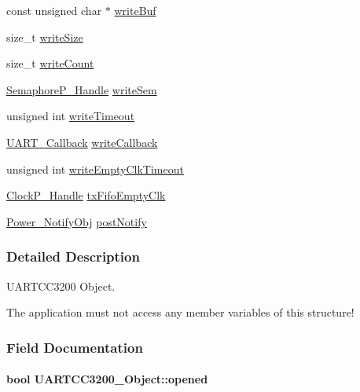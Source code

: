 \begin{DoxyCompactItemize}
\item 
const unsigned char $\ast$ \hyperlink{struct_u_a_r_t_c_c3200___object_ad0695b5fb3ae2132f990f6a803db7eed}{write\+Buf}
\item 
size\+\_\+t \hyperlink{struct_u_a_r_t_c_c3200___object_a3622ef828b2e49d747ccc609d4901cf9}{write\+Size}
\item 
size\+\_\+t \hyperlink{struct_u_a_r_t_c_c3200___object_a4c86feb4f6b6fbb006190c39befb7983}{write\+Count}
\item 
\hyperlink{_semaphore_p_8h_a7f34865f33e666455692544e5f12d1f2}{Semaphore\+P\+\_\+\+Handle} \hyperlink{struct_u_a_r_t_c_c3200___object_a21c6923ee3da9ff6fb6bd2159434997c}{write\+Sem}
\item 
unsigned int \hyperlink{struct_u_a_r_t_c_c3200___object_ad69e720af55b6156ca2fc33402531c1b}{write\+Timeout}
\item 
\hyperlink{_u_a_r_t_8h_a44620a9d91e0357ebc6f0a79984d9e1e}{U\+A\+R\+T\+\_\+\+Callback} \hyperlink{struct_u_a_r_t_c_c3200___object_a98e91ae360dc4187136f0166d5fd4dd2}{write\+Callback}
\item 
unsigned int \hyperlink{struct_u_a_r_t_c_c3200___object_abcd8361634ac3dbb99feb06a4acfd1fd}{write\+Empty\+Clk\+Timeout}
\item 
\hyperlink{_clock_p_8h_a003dd74e948999fe5c3f45d8f51501f1}{Clock\+P\+\_\+\+Handle} \hyperlink{struct_u_a_r_t_c_c3200___object_a282a5d98f7fc01abcd35ba94ce155abf}{tx\+Fifo\+Empty\+Clk}
\item 
\hyperlink{struct_power___notify_obj}{Power\+\_\+\+Notify\+Obj} \hyperlink{struct_u_a_r_t_c_c3200___object_a286f452599bda3d731989c1e0bb37e30}{post\+Notify}
\end{DoxyCompactItemize}


\subsubsection{Detailed Description}
U\+A\+R\+T\+C\+C3200 Object. 

The application must not access any member variables of this structure! 

\subsubsection{Field Documentation}
\paragraph[{opened}]{\setlength{\rightskip}{0pt plus 5cm}bool U\+A\+R\+T\+C\+C3200\+\_\+\+Object\+::opened}\label{struct_u_a_r_t_c_c3200___object_af160ca68e9cf96890d47d4fa0acd4926}
